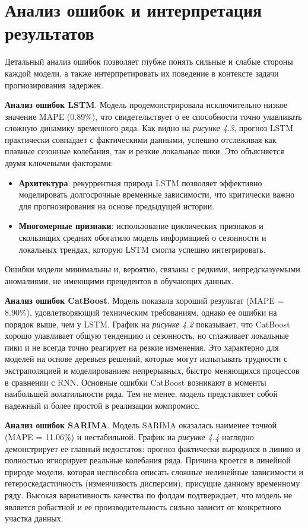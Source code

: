 \section{Анализ ошибок и интерпретация результатов}
\label{sec:error_analysis}

\hspace*{1.25cm}Детальный анализ ошибок позволяет глубже понять сильные и слабые стороны каждой модели, а также интерпретировать их поведение в контексте задачи прогнозирования задержек.


\hspace*{1.25cm} \textbf{Анализ ошибок LSTM}. Модель продемонстрировала исключительно низкое значение MAPE (0.89\%), что свидетельствует о ее способности точно улавливать сложную динамику временного ряда. Как видно на \textit{рисунке 4.3}, прогноз LSTM практически совпадает с фактическими данными, успешно отслеживая как плавные сезонные колебания, так и резкие локальные пики. Это объясняется двумя ключевыми факторами:
\begin{itemize}
	\item \textbf{Архитектура}: рекуррентная природа LSTM позволяет эффективно моделировать долгосрочные временные зависимости, что критически важно для прогнозирования на основе предыдущей истории.
	\item \textbf{Многомерные признаки}: использование циклических признаков и скользящих средних обогатило модель информацией о сезонности и локальных трендах, которую LSTM смогла успешно интегрировать.
\end{itemize}
Ошибки модели минимальны и, вероятно, связаны с редкими, непредсказуемыми аномалиями, не имеющими прецедентов в обучающих данных.

\hspace*{1.25cm} \textbf{Анализ ошибок CatBoost}. Модель показала хороший результат (MAPE = 8.90\%), удовлетворяющий техническим требованиям, однако ее ошибки на порядок выше, чем у LSTM. График на \textit{рисунке 4.2} показывает, что CatBoost хорошо улавливает общую тенденцию и сезонность, но сглаживает локальные пики и не всегда точно реагирует на резкие изменения. Это характерно для моделей на основе деревьев решений, которые могут испытывать трудности с экстраполяцией и моделированием непрерывных, быстро меняющихся процессов в сравнении с RNN. Основные ошибки CatBoost возникают в моменты наибольшей волатильности ряда. Тем не менее, модель представляет собой надежный и более простой в реализации компромисс.

\hspace*{1.25cm} \textbf{Анализ ошибок SARIMA}. Модель SARIMA оказалась наименее точной (MAPE = 11.06\%) и нестабильной. График на \textit{рисунке 4.4} наглядно демонстрирует ее главный недостаток: прогноз фактически выродился в линию и полностью игнорирует реальные колебания ряда. Причина кроется в линейной природе модели, которая неспособна описать сложные нелинейные зависимости и гетероскедастичность (изменчивость дисперсии), присущие данному временному ряду. Высокая вариативность качества по фолдам подтверждает, что модель не является робастной и ее производительность сильно зависит от конкретного участка данных.

